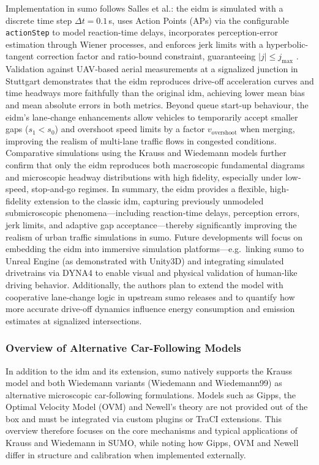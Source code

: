 Implementation in \ac{sumo} follows Salles et al.\cite{Salles2022}: the \ac{eidm} is simulated with a discrete time step $\Delta t = 0.1\,$s, uses Action Points (APs) via the configurable \texttt{actionStep} to model reaction-time delays, incorporates perception-error estimation through Wiener processes, and enforces jerk limits with a hyperbolic-tangent correction factor and ratio-bound constraint, guaranteeing $|j|\le j_{\max}$ .
Validation against UAV‐based aerial measurements at a signalized junction in Stuttgart demonstrates that the \ac{eidm} reproduces drive-off acceleration curves and time headways more faithfully than the original \ac{idm}, achieving lower mean bias and mean absolute errors in both metrics.
Beyond queue start-up behaviour, the \ac{eidm}’s lane‐change enhancements allow vehicles to temporarily accept smaller gaps ($s_1 < s_0$) and overshoot speed limits by a factor $v_\text{overshoot}$ when merging, improving the realism of multi-lane traffic flows in congested conditions. Comparative simulations using the Krauss and Wiedemann models further confirm that only the \ac{eidm} reproduces both macroscopic fundamental diagrams and microscopic headway distributions with high fidelity, especially under low‐speed, stop‐and‐go regimes. \cite{Schrader2023}
\mynewline
In summary, the \ac{eidm} provides a flexible, high‐fidelity extension to the classic \ac{idm}, capturing previously unmodeled submicroscopic phenomena—including reaction‐time delays, perception errors, jerk limits, and adaptive gap acceptance—thereby significantly improving the realism of urban traffic simulations in \ac{sumo}. Future developments will focus on embedding the \ac{eidm} into immersive simulation platforms—e.g.\ linking \ac{sumo} to Unreal Engine (as demonstrated with Unity3D) and integrating simulated drivetrains via DYNA4 to enable visual and physical validation of human-like driving behavior. Additionally, the authors plan to extend the model with cooperative lane‐change logic in upstream \ac{sumo} releases and to quantify how more accurate drive-off dynamics influence energy consumption and emission estimates at signalized intersections. \cite{Salles2022}

\subsubsection{Overview of Alternative Car-Following Models}
\label{subsubsec:alternative_models}
In addition to the \ac{idm} and its extension, \ac{sumo} natively supports the Krauss model and both Wiedemann variants (Wiedemann and Wiedemann99) as alternative microscopic car‐following formulations. Models such as Gipps, the Optimal Velocity Model (OVM) and Newell’s theory are not provided out of the box and must be integrated via custom plugins or TraCI extensions. This overview therefore focuses on the core mechanisms and typical applications of Krauss and Wiedemann in SUMO, while noting how Gipps, OVM and Newell differ in structure and calibration when implemented externally.

